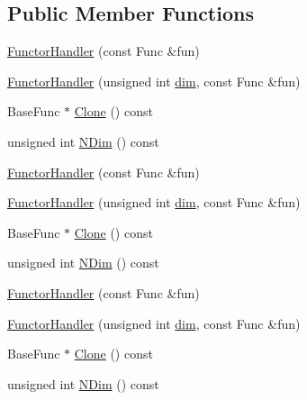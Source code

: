 \subsection*{Public Member Functions}
\begin{DoxyCompactItemize}
\item 
\mbox{\hyperlink{classROOT_1_1Math_1_1FunctorHandler_ae8715a95fff0a4bbaba7a1641f936257}{Functor\+Handler}} (const Func \&fun)
\item 
\mbox{\hyperlink{classROOT_1_1Math_1_1FunctorHandler_a48929822606300cdd1da079313a981b4}{Functor\+Handler}} (unsigned int \mbox{\hyperlink{adat__devel_2lib_2hadron_2irrep__util_8cc_a70b5e28b5bc3d1b63a7435c5fe50b837}{dim}}, const Func \&fun)
\item 
Base\+Func $\ast$ \mbox{\hyperlink{classROOT_1_1Math_1_1FunctorHandler_ad20fb7defe76e6abc244eff203aabbc6}{Clone}} () const
\item 
unsigned int \mbox{\hyperlink{classROOT_1_1Math_1_1FunctorHandler_a448b3a68a8b9a55489a0b33b4cb26c93}{N\+Dim}} () const
\item 
\mbox{\hyperlink{classROOT_1_1Math_1_1FunctorHandler_ae8715a95fff0a4bbaba7a1641f936257}{Functor\+Handler}} (const Func \&fun)
\item 
\mbox{\hyperlink{classROOT_1_1Math_1_1FunctorHandler_a48929822606300cdd1da079313a981b4}{Functor\+Handler}} (unsigned int \mbox{\hyperlink{adat__devel_2lib_2hadron_2irrep__util_8cc_a70b5e28b5bc3d1b63a7435c5fe50b837}{dim}}, const Func \&fun)
\item 
Base\+Func $\ast$ \mbox{\hyperlink{classROOT_1_1Math_1_1FunctorHandler_ad20fb7defe76e6abc244eff203aabbc6}{Clone}} () const
\item 
unsigned int \mbox{\hyperlink{classROOT_1_1Math_1_1FunctorHandler_a448b3a68a8b9a55489a0b33b4cb26c93}{N\+Dim}} () const
\item 
\mbox{\hyperlink{classROOT_1_1Math_1_1FunctorHandler_ae8715a95fff0a4bbaba7a1641f936257}{Functor\+Handler}} (const Func \&fun)
\item 
\mbox{\hyperlink{classROOT_1_1Math_1_1FunctorHandler_a48929822606300cdd1da079313a981b4}{Functor\+Handler}} (unsigned int \mbox{\hyperlink{adat__devel_2lib_2hadron_2irrep__util_8cc_a70b5e28b5bc3d1b63a7435c5fe50b837}{dim}}, const Func \&fun)
\item 
Base\+Func $\ast$ \mbox{\hyperlink{classROOT_1_1Math_1_1FunctorHandler_ad20fb7defe76e6abc244eff203aabbc6}{Clone}} () const
\item 
unsigned int \mbox{\hyperlink{classROOT_1_1Math_1_1FunctorHandler_a448b3a68a8b9a55489a0b33b4cb26c93}{N\+Dim}} () const
\end{DoxyCompactItemize}



